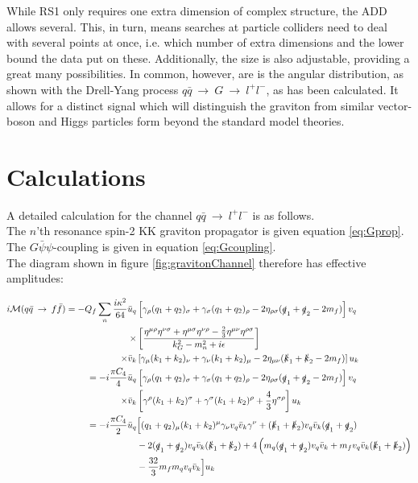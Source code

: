 \documentclass[11pt,a4paper]{article}
\begin{document}
While RS1 only requires one extra dimension of complex structure, the ADD allows several. This, in turn, means searches at particle colliders need to deal with several points at once, i.e. which number of extra dimensions and the lower bound the data put on these. Additionally, the size is also adjustable, providing a great many possibilities. In common, however, are is the angular distribution, as shown with the Drell-Yang process $q\bar{q}\:\rightarrow\:G\:\rightarrow\:l^+l^-$, as has been calculated. It allows for a distinct signal which will distinguish the graviton from similar vector-boson and Higgs particles form beyond the standard model theories.\\

\appendix
\section{Calculations}
A detailed calculation for the channel $q\bar{q}\:\rightarrow\:l^+l^-$ is as follows.\\
The $n$'th resonance spin-2 KK graviton propagator is given equation \ref{eq:Gprop}. The $G\bar{\psi}\psi$-coupling is given in equation \ref{eq:Gcoupling}.\\
The diagram shown in figure \ref{fig:gravitonChannel} therefore has effective amplitudes:

\begin{align}
	\begin{split}
	i\mathcal{M}(q\bar{q}\:\rightarrow\:f\bar{f}) = -Q_f\sum_{n}\frac{i\kappa^2}{64}\bar{u}_q&\left[\gamma_\rho(q_1 + q_2)_\sigma + \gamma_\sigma(q_1+q_2)_\rho - 2\eta_{\rho\sigma}(\slashed q_1 + \slashed q_2 - 2m_f)\right]v_q\\
	\times&\left[\frac{\eta^{\mu\rho}\eta^{\nu\sigma} + \eta^{\mu\sigma}\eta^{\nu\rho} - \frac{2}{3}\eta^{\mu\nu}\eta^{\rho\sigma}}{k_G^2 - m_n^2 + i\epsilon}\right]\\
	\times\bar{v}_k&\left[\gamma_\mu(k_1 + k_2)_\nu + \gamma_\nu(k_1+k_2)_\mu - 2\eta_{\mu\nu}(\slashed k_1 + \slashed k_2 - 2m_f)\right]u_k\\
	= -i\frac{\pi C_4}{4}\bar{u}_q&\left[\gamma_\rho(q_1 + q_2)_ \sigma + \gamma_\sigma(q_1+q_2)_\rho - 2\eta_{\rho\sigma}(\slashed q_1 + \slashed q_2 - 2m_f)\right]v_q\\
	\times\bar{v}_k&\left[\gamma^\rho(k_1 + k_2)^\sigma + \gamma^\sigma(k_1+k_2)^\rho + \frac{4}{3}\eta^{\sigma\rho}\right]u_k\\
	= -i\frac{\pi C_4}{2}\bar{u}_q&\Big[(q_1 + q_2)_ \mu(k_1+k_2)^\mu \gamma_\nu v_q\bar{v}_k\gamma^\nu + (\slashed k_1 + \slashed k_2)v_q\bar{v}_k(\slashed q_1 + \slashed q_2)\\
	&- 2(\slashed q_1 + \slashed q_2)v_q\bar{v}_k(\slashed k_1 + \slashed k_2) + 4\left(m_q(\slashed q_1 + \slashed q_2)v_q\bar{v}_k + m_fv_q\bar{v}_k(\slashed k_1 + \slashed k_2)\right)\\
	&- \frac{32}{3}m_fm_qv_q\bar{v}_k\Big]u_k
	\end{split}
\end{align}
\end{document}
